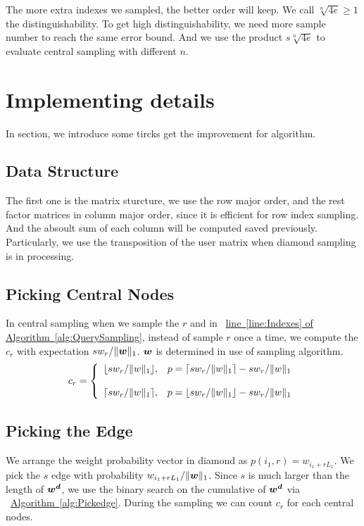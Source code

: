\documentclass[letterpaper]{article}
\newcommand{\V}[1]{{\bm{{\MakeLowercase{#1}}}}}
\newcommand{\norm}[2]{\|#1\|_{#2}}
\newcommand{\Alg}[1] {\hyperref[alg:#1] {Algorithm~\ref*{alg:#1}}}
\newcommand{\AlgLine}[2]{\hyperref[alg:#1]{line~\ref*{line:#2} of Algorithm~\ref*{alg:#1}}}
\begin{document}
The more extra indexes we sampled, the better order will keep. We call $\sqrt[n]{4e}\geq 1$ the distinguishability. To get high distinguishability, we need more sample number to reach the same error bound. And we use the product $s\sqrt[n]{4e}$ to evaluate central sampling with different $n$.
\section{Implementing details}
In section, we introduce some tircks get the improvement for algorithm.

\subsection{Data Structure}
The first one is the matrix sturcture, we use the row major order, and the rest factor matrices in column major order, since it is efficient for row index sampling. And the absoult sum of each column  will be computed saved previously. Particularly, we use the transposition of the user matrix when diamond sampling is in processing.

\subsection{Picking Central Nodes}
In central sampling when we sample the $r$ and in ~\AlgLine{QuerySampling}{Indexes}, instead of sample $r$ once a time, we compute the $c_r$ with expectation $sw_r/\norm{\V{w}}{1}$. $\V{w}$ is determined in use of sampling algorithm.
\begin{equation*}c_r=
    \left\{
      \begin{array}{ll}
        \lfloor sw_r/\norm{w}{1} \rfloor,
        & \hbox{$p=\lceil sw_r/\norm{w}{1} \rceil - sw_r/\norm{w}{1}$} \\\\
        \lceil sw_r/\norm{w}{1} \rceil,
        & \hbox{$p=\lfloor sw_r/\norm{w}{1} \rfloor - sw_r/\norm{w}{1}$}
      \end{array}
    \right.
\end{equation*}

\subsection{Picking the Edge}
We arrange the weight probability vector in diamond as $p(i_1,r) = w_{i_1+rL_1}$.
We pick the $s$ edge with probability  $w_{i_1+rL_1}/\norm{\V{W}}{1}$. Since $s$ is much larger than the length of $\V{w^d}$, we use the binary search on the cumulative of $\V{w^d}$ via ~\Alg{Pickedge}. During the sampling we can count $c_r$ for each central nodes.
\end{document}
